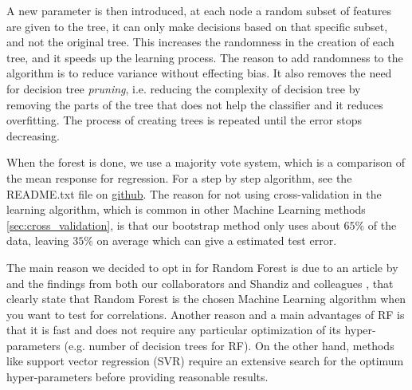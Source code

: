 A new parameter is then introduced, at each node a random subset of features are given to the tree, it can only make decisions based on that specific subset, and not the original tree. This increases the randomness in the creation of each tree, and it speeds up the learning process. The reason to add randomness to the algorithm is to reduce variance without effecting bias. It also removes the need for decision tree \textit{pruning}, i.e. reducing the complexity of decision tree by removing the parts of the tree that does not help the classifier and it reduces overfitting. The process of creating trees is repeated until the error stops decreasing. 

When the forest is done, we use a majority vote system, which is a comparison of the mean response for regression. For a step by step algorithm, see the README.txt file on \href{https://github.com/sondrt/Machine-Learning-the-Voltage-Capacity-and-Energy-density-of-Electrode-Materials}{github}. 
The reason for not using cross-validation in the learning algorithm, which is common in other Machine Learning methods \ref{sec:cross_validation}, is that our bootstrap method only uses about $65\%$ of the data, leaving $35\%$ on average which can give a estimated test error. 

The main reason we decided to opt in for Random Forest is due to an article by \cite{fernandez2014we} and the findings from both our collaborators \cite{tsamardinos2020automated} and Shandiz and colleagues \cite{shandiz2016application}, that clearly state that Random Forest is the chosen Machine Learning algorithm when you want to test for correlations. Another reason and a main advantages of RF is that it is fast and does not require any particular optimization of its hyper-parameters (e.g. number of decision trees for RF). On the other hand, methods like support vector regression (SVR) require an extensive search for the optimum hyper-parameters before providing reasonable results.

	

